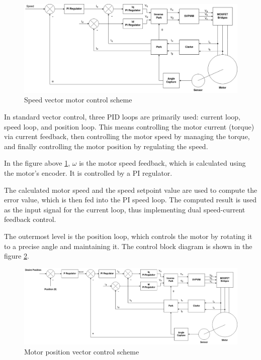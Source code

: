 \begin{figure}[H]
	\centering
	\includegraphics[width=\textwidth]{Src/images/speed.drawio.png}
	\caption{Speed vector motor control scheme}
	\label{ACDFOCALGSPD}
\end{figure}

In standard vector control, three PID loops are primarily used: current loop, speed loop, and position loop. This means controlling the motor current (torque) via current feedback, then controlling the motor speed by managing the torque, and finally controlling the motor position by regulating the speed.

In the figure above \ref{ACDFOCALGSPD}, \(\omega\) is the motor speed feedback, which is calculated using the motor's encoder. It is controlled by a PI regulator.

The calculated motor speed and the speed setpoint value are used to compute the error value, which is then fed into the PI speed loop. The computed result is used as the input signal for the current loop, thus implementing dual speed-current feedback control.

The outermost level is the position loop, which controls the motor by rotating it to a precise angle and maintaining it. The control block diagram is shown in the figure \ref{ACDFOCALGPOS}.


\begin{figure}[H]
	\centering
	\includegraphics[width=\textwidth]{Src/images/Foc pos.drawio.png}
	\caption{Motor position vector control scheme}
	\label{ACDFOCALGPOS}
\end{figure}


